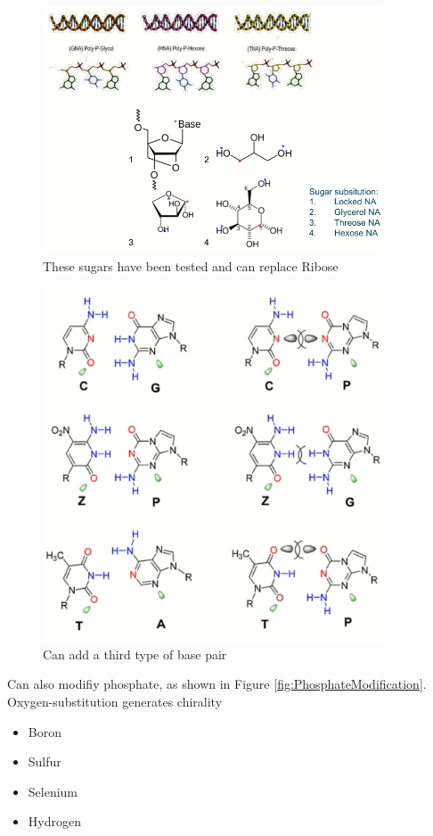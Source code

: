 \documentclass[]{article}
\begin{document}
\begin{figure}[H]
	\caption{These sugars have been tested and can replace Ribose} \label{fig:AlternativeSugars} 
	\includegraphics[width=0.9\textwidth]{AlternativeSugars}
\end{figure}

\begin{figure}[H]
	\caption{Can add a third type of base pair} \label{fig:ExpandGeneticCode} 
	\includegraphics[width=0.9\textwidth]{ExpandGeneticCode}
\end{figure}

Can also modifiy phosphate, as shown in Figure \ref{fig:PhosphateModification}. Oxygen-substitution generates chirality
\begin{itemize}
	\item Boron
	\item Sulfur
	\item Selenium
	\item Hydrogen
\end{itemize}
\end{document}
